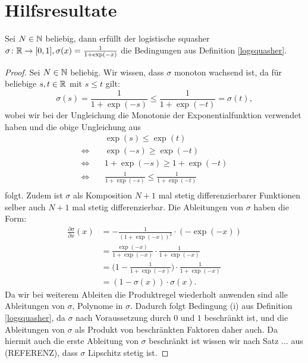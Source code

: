 \section{Hilfsresultate}
\begin{lem}
\label{lem:logsquasher}
Sei $N \in \mathbb{N}$ beliebig, dann erfüllt der logistische squasher $\sigma\colon \mathbb{R} \to [0, 1], \sigma(x) = \frac{1}{1 + \exp(-x)}$ die Bedingungen aus Definition \ref{logsquasher}.  
\end{lem}
\begin{proof}
Sei $N \in \mathbb{N}$ beliebig. Wir wissen, dass $\sigma$ monoton wachsend ist, da für beliebige $s, t \in \mathbb{R}$ mit $s \leq t$ gilt:
$$\sigma(s) = \frac{1}{1 + \exp(-s)} \leq \frac{1}{1 + \exp(-t)} = \sigma(t),$$
wobei wir bei der Ungleichung die Monotonie der Exponentialfunktion verwendet haben und die obige Ungleichung aus
\begin{equation*}
\begin{split}
& \quad \exp(s) \leq \exp(t) \\
 \Leftrightarrow & \quad \exp(-s) \geq \exp(-t) \\
 \Leftrightarrow & \quad 1 + \exp(-s) \geq 1 + \exp(-t) \\
 \Leftrightarrow & \quad \frac{1}{1 + \exp(-s)} \leq \frac{1}{1 + \exp(-t)} \\
\end{split}
\end{equation*}
folgt. Zudem ist $\sigma$ als Komposition $N + 1$ mal stetig differenzierbarer Funktionen selber auch $N + 1$ mal stetig differenzierbar. Die Ableitungen von $\sigma$ haben die Form$\colon$
\begin{equation*}
\begin{split}
\frac{\partial \sigma}{\partial x}(x) &= -\frac{1}{(1 + \exp(-x))^2} \cdot (-\exp(-x)) \\
& = \frac{\exp(-x)}{1 + \exp(-x)} \cdot \frac{1}{1 + \exp(-x)} \\
& = \bigg(1 - \frac{1}{1 + \exp(-x)}\bigg) \cdot \frac{1}{1 + \exp(-x)} \\
& = (1 - \sigma(x)) \cdot \sigma(x).
\end{split}
\end{equation*}
Da wir bei weiterem Ableiten die Produktregel wiederholt anwenden sind alle Ableitungen von $\sigma$, Polynome in $\sigma$. Dadurch folgt Bedingung (i) aus Definition \ref{logsquasher}, da $\sigma$ nach Voraussetzung durch $0$ und $1$ beschränkt ist, und die Ableitungen von $\sigma$ als Produkt von beschränkten Faktoren daher auch. Da hiermit auch die erste Ableitung von $\sigma$ beschränkt ist wissen wir nach Satz ... aus (REFERENZ), dass $\sigma$ Lipschitz stetig ist.

\end{proof}
